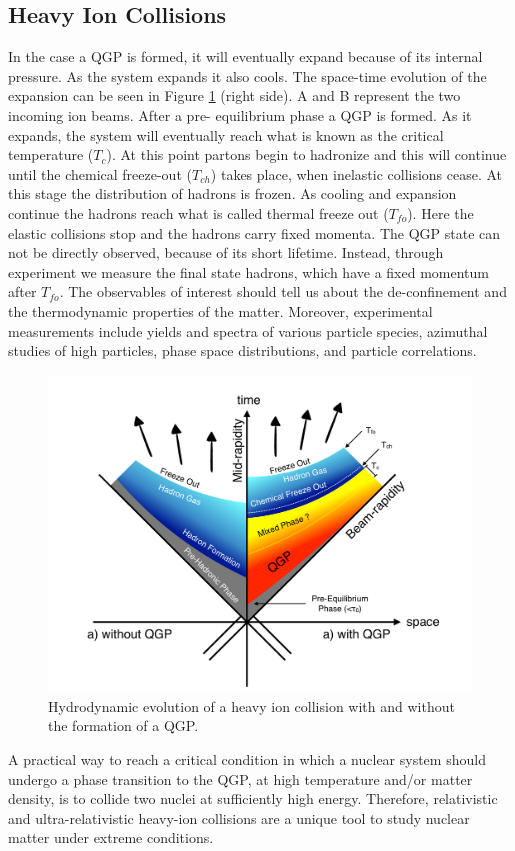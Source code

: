 \subsection{Heavy Ion Collisions}
In the case a QGP is formed, it will eventually expand because of its internal pressure. As the system expands it also cools. The space-time evolution of the expansion can be seen in Figure \ref{fig:freezeout} (right side). A and B represent the two incoming ion beams. After a pre- equilibrium phase a QGP is formed. As it expands, the system will eventually reach what is known as the critical temperature ($T_{c}$). At this point partons begin to hadronize and this will continue until the chemical freeze-out ($T_{ch}$) takes place, when inelastic collisions cease. At this stage the distribution of hadrons is frozen. As cooling and expansion continue the hadrons reach what is called thermal freeze out ($T_{fo}$). Here the elastic collisions stop and the hadrons carry fixed momenta. The QGP state can not be directly observed, because of its short lifetime. Instead, through experiment we measure the final state hadrons, which have a fixed momentum after $T_{fo}$. The observables of interest should tell us about the de-confinement and the thermodynamic properties of the matter. Moreover, experimental measurements include yields and \pt spectra of various particle species, azimuthal studies of high \pt particles, phase space distributions, and particle correlations.

\begin{figure}[htbp]
\begin{center}
\includegraphics[width=10.cm]{./Version1/FigChapter1/FreezeOut}
\caption{Hydrodynamic evolution of a heavy ion collision with and without the formation of a QGP. }
\label{fig:freezeout}
\end{center}
\end{figure}

A practical way to reach a critical condition in which a nuclear system should undergo a phase transition to the QGP, at high temperature and/or matter density, is to collide two nuclei at sufficiently high energy. Therefore, relativistic and ultra-relativistic heavy-ion collisions are a unique tool to study nuclear matter under extreme conditions.


\newpage